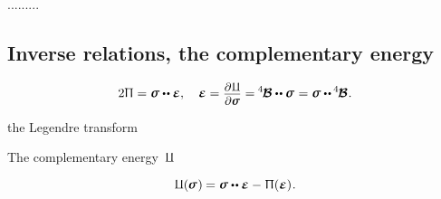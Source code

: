 .........

\subsection*{Inverse relations, the complementary energy}

\begin{equation}\label{invertedHooke.forisotropic}
2 \potentialenergydensity = \linearstress \dotdotp \infinitesimaldeformation,
\hspace{1em}
\infinitesimaldeformation
= \scalebox{.92}{$ \displaystyle
   \frac{ \raisemath{-0.15em}{
      \partial \hspace{.1ex} \complementaryenergydensity
   } }{ \raisemath{.033em}{
      \partial \linearstress
   } }
$}
= \hspace{-0.1ex} \pliabilitytensor \dotdotp \linearstress
\hspace{.1ex} =
\linearstress \dotdotp \hspace{-0.1ex} \pliabilitytensor
\hspace{.1ex} .
\end{equation}

the Legendre transform

The complementary energy~$\complementaryenergydensity$

\begin{equation}\label{someotherlabel.for.thecomplementaryenergy}
\complementaryenergydensity( \hspace{-0.1ex} \linearstress \hspace{.12ex} ) \hspace{-0.1ex}
= \linearstress \dotdotp \infinitesimaldeformation
- \hspace{.1ex} \potentialenergydensity(\infinitesimaldeformation)
\hspace{.1ex} .
\end{equation}

\en{,}

